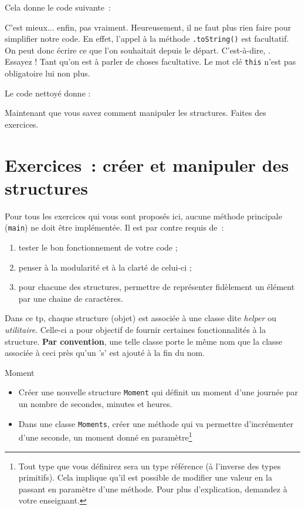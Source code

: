 \documentclass[a4paper,11pt]{article}
\begin{document}
	Cela donne le code suivante~:


	C'est mieux... enfin, pas vraiment. Heureusement, il ne faut plus rien faire
	pour simplifier notre code. En effet, l'appel à la méthode
	\texttt{.toString()} est facultatif. On peut donc écrire ce que l'on
	souhaitait depuis le départ. C'est-à-dire,
	. Essayez ! Tant qu'on est à parler de
	choses facultative. Le mot clé \texttt{this} n'est pas obligatoire lui non plus.

	Le code nettoyé donne :

	Maintenant que vous savez comment manipuler les \og structures\fg. Faites des exercices.


	\bigskip

\section{Exercices~: créer et manipuler des structures}
	
	Pour tous les exercices qui vous sont proposés ici, aucune méthode principale (\texttt{main}) ne doit être implémentée. Il est par contre requis de~:
	\begin{enumerate}
		\item tester le bon fonctionnement de votre code ;
		\item penser à la modularité et à la clarté de celui-ci ;
		\item pour chacune des structures, permettre de représenter fidèlement un élément par une chaine de caractères.
	\end{enumerate}

	Dans ce tp, chaque structure (objet) est associée à une classe dite \emph{helper} ou \emph{utilitaire}. Celle-ci a pour objectif de fournir certaines fonctionnalités à la structure. \textbf{Par convention}, une telle classe porte le même nom que la classe associée à ceci près qu'un 's' est ajouté à la fin du nom.

	\begin{Exercice}{Moment}
		\begin{itemize}
			\item
				Créer une nouvelle structure \texttt{Moment} qui définit un moment d'une journée par un nombre de secondes, minutes et heures.
			
			\item Dans une classe \texttt{Moments}, créer une méthode
				 qui va permettre
				d'incrémenter d'une seconde, un moment donné en
				paramètre\footnote{Tout type que vous définirez sera un type
					référence (à l'inverse des types primitifs). Cela implique
					qu'il est possible de modifier une valeur en la passant en
				paramètre d'une méthode. Pour plus d'explication, demandez
			à votre enseignant.}

		\end{itemize}		
	\end{Exercice}
\end{document}
